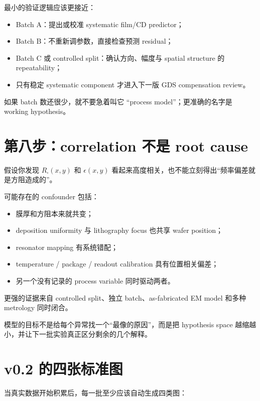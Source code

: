最小的验证逻辑应该更接近：

\begin{itemize}
  \item Batch A：提出或校准 systematic film/CD predictor；
  \item Batch B：不重新调参数，直接检查预测 residual；
  \item Batch C 或 controlled split：确认方向、幅度与 spatial structure 的 repeatability；
  \item 只有稳定 systematic component 才进入下一版 GDS compensation review。
\end{itemize}

如果 batch 数还很少，就不要急着叫它 ``process model''；更准确的名字是 working hypothesis。

\section{第八步：correlation 不是 root cause}

假设你发现 $R_\square(x,y)$ 和 $\epsilon(x,y)$ 看起来高度相关，也不能立刻得出“频率偏差就是方阻造成的”。

可能存在的 confounder 包括：

\begin{itemize}
  \item 膜厚和方阻本来就共变；
  \item deposition uniformity 与 lithography focus 也共享 wafer position；
  \item resonator mapping 有系统错配；
  \item temperature / package / readout calibration 具有位置相关偏差；
  \item 另一个没有记录的 process variable 同时驱动两者。
\end{itemize}

更强的证据来自 controlled split、独立 batch、as-fabricated EM model 和多种 metrology 同时闭合。

\begin{checkpointbox}
模型的目标不是给每个异常找一个“最像的原因”，而是把 hypothesis space 越缩越小，并让下一批实验真正区分剩余的几个解释。
\end{checkpointbox}

\section{v0.2 的四张标准图}

当真实数据开始积累后，每一批至少应该自动生成四类图：


